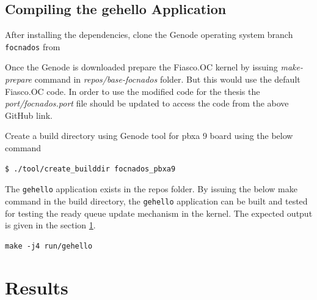 \subsection{Compiling the gehello Application}
After installing the dependencies, clone the Genode operating system branch \texttt{focnados} from %

Once the Genode is downloaded prepare the Fiasco.OC kernel by issuing \textit{make-prepare} command in \textit{repos/base-focnados} folder.  But this would use the default Fiasco.OC code. In order to use the modified code for the thesis the \textit{port/focnados.port} file should be updated to access the code from the above GitHub link. %

Create a build directory using Genode tool for pbxa 9 board using the below command
\begin{verbatim}
$ ./tool/create_builddir focnados_pbxa9
\end{verbatim}

The \texttt{gehello} application exists in the repos folder. By issuing the below make command in the build directory, the \texttt{gehello}  application can be built and tested for testing the ready queue update mechanism in the kernel. The expected output is given in the section \ref{testing:results}.

\begin{verbatim}
make -j4 run/gehello
\end{verbatim}

\section{Results}\label{testing:results}
